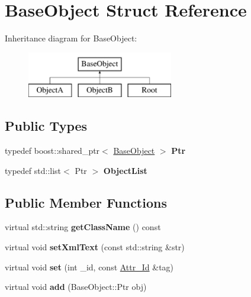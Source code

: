 \hypertarget{struct_base_object}{
\section{BaseObject Struct Reference}
\label{struct_base_object}
}
Inheritance diagram for BaseObject:\begin{figure}[H]
\begin{center}
\leavevmode
\includegraphics[height=2.000000cm]{struct_base_object}
\end{center}
\end{figure}
\subsection*{Public Types}
\begin{DoxyCompactItemize}
\item 
\hypertarget{struct_base_object_a7ecc9bc87cf19bd60e5e50196860b452}{
typedef boost::shared\_\-ptr$<$ \hyperlink{struct_base_object}{BaseObject} $>$ {\bfseries Ptr}}
\label{struct_base_object_a7ecc9bc87cf19bd60e5e50196860b452}

\item 
\hypertarget{struct_base_object_a4c21b0a74ab436e30808a5b0f8f88749}{
typedef std::list$<$ Ptr $>$ {\bfseries ObjectList}}
\label{struct_base_object_a4c21b0a74ab436e30808a5b0f8f88749}

\end{DoxyCompactItemize}
\subsection*{Public Member Functions}
\begin{DoxyCompactItemize}
\item 
\hypertarget{struct_base_object_a337d1ab0b5cd0c4465a060ddf45b3dbf}{
virtual std::string {\bfseries getClassName} () const }
\label{struct_base_object_a337d1ab0b5cd0c4465a060ddf45b3dbf}

\item 
\hypertarget{struct_base_object_a2e328ceafd2c8e003e2341491c708639}{
virtual void {\bfseries setXmlText} (const std::string \&str)}
\label{struct_base_object_a2e328ceafd2c8e003e2341491c708639}

\item 
\hypertarget{struct_base_object_ab4d5d402601ab470c8215472f7728f2c}{
virtual void {\bfseries set} (int \_\-id, const \hyperlink{struct_attr___id}{Attr\_\-Id} \&tag)}
\label{struct_base_object_ab4d5d402601ab470c8215472f7728f2c}

\item 
\hypertarget{struct_base_object_a6158dda22c5be7f8ac10c9e29f3c9f1d}{
virtual void {\bfseries add} (BaseObject::Ptr obj)}
\label{struct_base_object_a6158dda22c5be7f8ac10c9e29f3c9f1d}

\end{DoxyCompactItemize}
